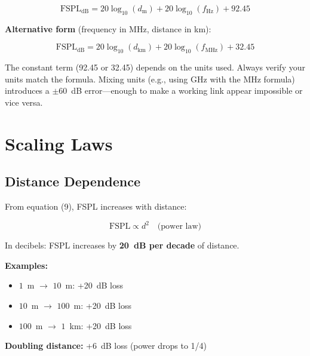 \begin{equation}
\text{FSPL}_{\text{dB}} = 20\log_{10}(d_{\text{m}}) + 20\log_{10}(f_{\text{Hz}}) + 92.45
\end{equation}

\textbf{Alternative form} (frequency in MHz, distance in km):

\begin{equation}
\text{FSPL}_{\text{dB}} = 20\log_{10}(d_{\text{km}}) + 20\log_{10}(f_{\text{MHz}}) + 32.45
\end{equation}

\begin{warningbox}
The constant term (92.45 or 32.45) depends on the units used. Always verify your units match the formula. Mixing units (e.g., using GHz with the MHz formula) introduces a $\pm 60$~dB error---enough to make a working link appear impossible or vice versa.
\end{warningbox}

\section{Scaling Laws}

\subsection{Distance Dependence}

From equation (9), FSPL increases with distance:

\begin{equation}
\text{FSPL} \propto d^2 \quad \text{(power law)}
\end{equation}

In decibels: FSPL increases by \textbf{20~dB per decade} of distance.

\textbf{Examples:}
\begin{itemize}
\item $1$~m $\rightarrow$ $10$~m: +20~dB loss
\item $10$~m $\rightarrow$ $100$~m: +20~dB loss
\item $100$~m $\rightarrow$ $1$~km: +20~dB loss
\end{itemize}

\textbf{Doubling distance:} +6~dB loss (power drops to 1/4)

